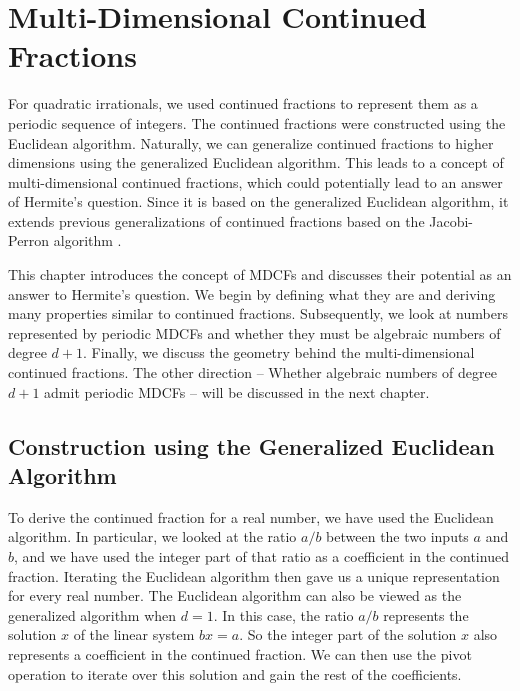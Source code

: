 \chapter{Multi-Dimensional Continued Fractions}
\label{ch:mdcf}

For quadratic irrationals, we used continued fractions to represent them as a
periodic sequence of integers.
The continued fractions were constructed using the Euclidean algorithm.
Naturally, we can generalize continued fractions to higher dimensions using the
generalized Euclidean algorithm.
This leads to a concept of multi-dimensional continued fractions, which could
potentially lead to an answer of Hermite's question.
Since it is based on the generalized Euclidean algorithm,
it extends previous generalizations of continued fractions based on the
Jacobi-Perron algorithm \cite{Gupta00}.

This chapter introduces the concept of MDCFs and discusses their potential as
an answer to Hermite's question.
We begin by defining what they are and deriving many properties similar to
continued fractions.
Subsequently, we look at numbers represented by periodic MDCFs and whether they
must be algebraic numbers of degree $d+1$.
Finally, we discuss the geometry behind the multi-dimensional continued fractions.
The other direction -- Whether algebraic numbers of degree $d+1$ admit periodic
MDCFs -- will be discussed in the next chapter.

\section{Construction using the Generalized Euclidean Algorithm}

To derive the continued fraction for a real number, we have used the Euclidean algorithm.
In particular, we looked at the ratio $a/b$ between the two inputs $a$ and $b$,
and we have used the integer part of that ratio as a coefficient in the
continued fraction.
Iterating the Euclidean algorithm then gave us a unique representation for
every real number.
The Euclidean algorithm can also be viewed as the generalized algorithm when $d = 1$.
In this case, the ratio $a/b$ represents the solution $x$ of the linear system $bx = a$.
So the integer part of the solution $x$ also represents a coefficient in the
continued fraction.
We can then use the pivot operation to iterate over this solution and gain the
rest of the coefficients.

